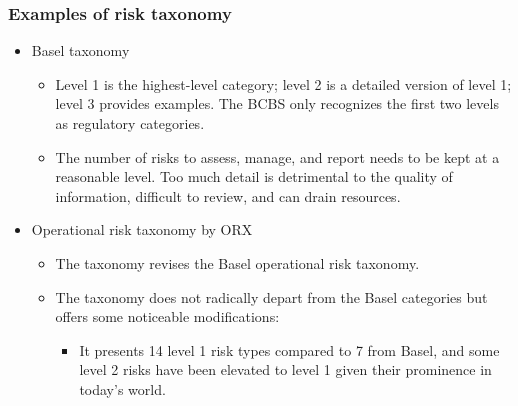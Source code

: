 \subsubsection{Examples of risk taxonomy}
\begin{itemize}
\item Basel taxonomy
    \begin{itemize}
    \item Level 1 is the highest-level category; level 2 is a detailed version of level 1; level 3 provides examples. The BCBS only recognizes the first two levels as regulatory categories.
    \item  The number of risks to assess, manage, and report needs to be kept at a reasonable level. Too much detail is detrimental to the quality of information, difficult to review, and can drain resources.
    \end{itemize}
\item Operational risk taxonomy by ORX
    \begin{itemize}
    \item The taxonomy revises the Basel operational risk taxonomy.
    \item  The taxonomy does not radically depart from the Basel categories but offers some noticeable modifications:
        \begin{itemize}
        \item It presents 14 level 1 risk types compared to 7 from Basel, and some level 2 risks have been elevated to level 1 given their prominence in today's world.
        \end{itemize}
    \end{itemize}
\end{itemize}




